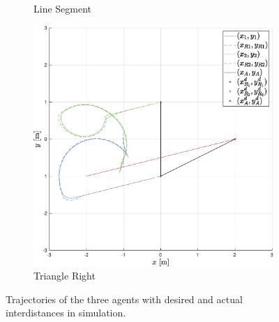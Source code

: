 \documentclass{ifacconf}
\begin{document}
\begin{figure}
\begin{subfigure}[b]{0.32\columnwidth}
        \caption{Line Segment}
    \end{subfigure}
    \begin{subfigure}[b]{0.32\columnwidth}
        \centering
        \includegraphics[width=\linewidth]{images/simulations/with_APF/3rd_scenario_with.eps}
      \caption{Triangle Right}
    \end{subfigure}
    \vspace{-0.2cm}
    \caption{Trajectories of the three agents with desired and actual interdistances in simulation.}
\end{figure}
\end{document}
